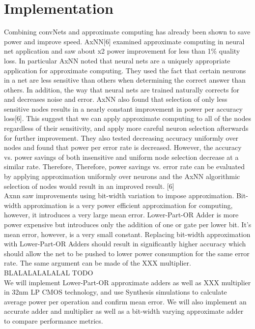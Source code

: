 \documentclass[journal]{IEEEtran}
\begin{document}
\section{Implementation}
	\indent Combining convNets and approximate computing has already been shown to save power and improve speed. AxNN[6] examined approximate computing in neural net application and saw about x2 power improvement for less than 1\% quality loss. In particular AxNN noted that neural nets are a uniquely appropriate application for approximate computing. They used the fact that certain neurons in a net are less sensitive than others when determining the correct answer than others. In addition, the way that neural nets are trained naturally corrects for and decreases noise and error. AxNN also found that selection of only less sensitive nodes results in a nearly constant improvement in power per accuracy loss[6]. This suggest that we can apply approximate computing to all of the nodes regardless of their sensitivity, and apply more careful neuron selection afterwards for further improvement.
They also tested decreasing accuracy uniformly over nodes and found that power per error rate is decreased. However, the accuracy vs. power savings of both insensitive and uniform node selection decrease at a similar rate. Therefore, 
Therefore, power savings vs. error rate can be evaluated by applying approximation uniformly over neurons and the AxNN algorithmic selection of nodes would result in an improved result. [6] \\ 


	\indent Axnn saw improvements using bit-width variation to impose approximation. Bit-width approximation is a very power efficient approximation for computing, however, it introduces a very large mean error. Lower-Part-OR Adder is more power expensive but introduces only the addition of one or gate per lower bit. It's mean error, however, is a very small constant. Replacing bit-width approximation with Lower-Part-OR Adders should result in significantly higher accuracy which should allow the net to be pushed to lower power consumption for the same error rate. The same argument can be made of the XXX multiplier. BLALALALALALAL TODO\\

	\indent We will implement Lower-Part-OR approximate adders as well as XXX multiplier in 32nm LP CMOS technology, and use Synthesis simulations to calculate average power per operation and confirm mean error. We will also implement an accurate adder and multiplier as well as a  bit-width varying approximate adder to compare performance metrics.\\
\end{document}
